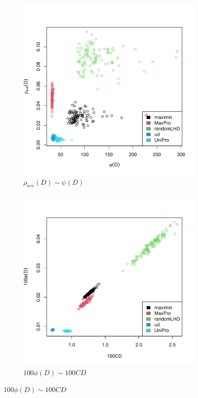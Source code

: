 \documentclass [PhD] {package/uclathes}
\begin{document}
\begin{figure}
\begin{adjustwidth}{-2cm}{-2cm}
\begin{subfigure}[b]{0.3\textwidth}
\end{subfigure}
\vfill
\begin{subfigure}[b]{0.3\textwidth}
\centering
\caption{$\rho_{ave}(D)\sim \psi(D)$}
\includegraphics[width=\textwidth]{chapters/EGO/pdfs/psi_rho_ave}
\end{subfigure}
\begin{subfigure}[b]{0.3\textwidth}
\centering
\caption{$100\phi(D)\sim 100CD$}
\includegraphics[width=\textwidth]{chapters/EGO/pdfs/cd_eta}

\end{subfigure}
\end{adjustwidth}
\end{figure}
\end{document}
